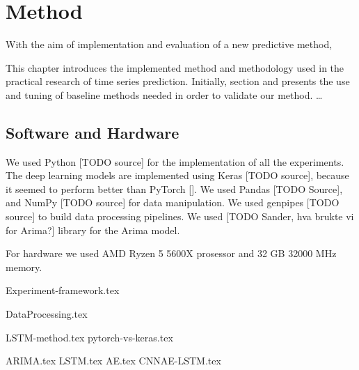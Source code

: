\chapter{Method}
\label{section:Method}

With the aim of implementation and evaluation of a new predictive method,

This chapter introduces the implemented method and methodology used in the practical research of time series prediction.
Initially, section  and  presents the use and tuning of baseline methods needed in order to validate our method.
\dots

\section{Software and Hardware}
We used Python [TODO source] for the implementation of all the experiments.
The deep learning models are implemented using Keras [TODO source], because it seemed to perform better than PyTorch
  [].
We used Pandas [TODO Source], and NumPy [TODO source] for data manipulation.
We used genpipes [TODO source] to build data processing pipelines.
We used [TODO Sander, hva brukte vi for Arima?] library for the Arima model.

For hardware we used AMD Ryzen 5 5600X prosessor and 32 GB 32000 MHz memory.

{Experiment-framework.tex}

{DataProcessing.tex}

{LSTM-method.tex}
{pytorch-vs-keras.tex}


{ARIMA.tex}
{LSTM.tex}
{AE.tex}
{CNNAE-LSTM.tex}
